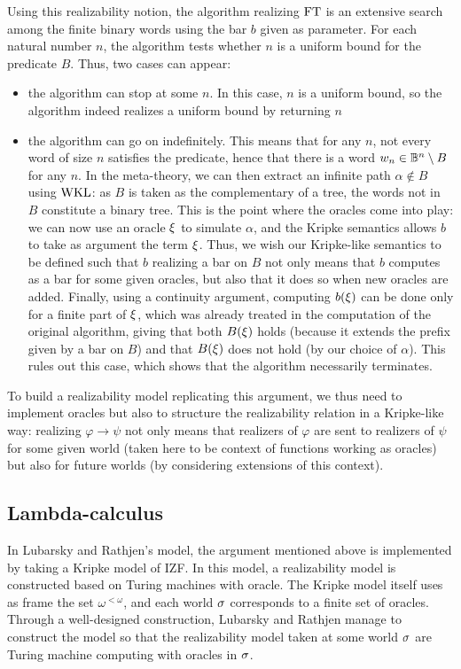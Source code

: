 \documentclass[a4paper,UKenglish,cleveref, autoref, thm-restate]{lipics-v2021}
\begin{document}
Using this realizability notion, the algorithm realizing $\mathrm{FT}$ is an extensive
search among the finite binary words using the bar $b$ given as parameter.
For each natural number $n$, the algorithm tests whether $n$ is a uniform bound
for the predicate $B$.
Thus, two cases can appear:
\begin{itemize}
\item the algorithm can stop at some $n$.
In this case, $n$ is a uniform bound, so the algorithm indeed realizes a uniform bound by returning $n$
\item the algorithm can go on indefinitely.
This means that for any $n$, not every word of size $n$ satisfies the predicate,
hence that there is a word $w_n\in \mathbb B^n \setminus B$ for any $n$.
In the meta-theory, we can then extract an infinite path $\alpha \notin B$
using $\mathrm{WKL}$: as $B$ is taken as the complementary of a tree, the words not in $B$ constitute a binary tree.
This is the point where the oracles come into play:
we can now use an oracle $\xi$ to simulate $\alpha$,
and the Kripke semantics allows $b$ to take as argument the term $\xi$.
Thus, we wish our Kripke-like semantics to be defined such that $b$ realizing a bar on $B$ not only means that $b$ computes as a bar for some given oracles, but also that it does so when new oracles are added. Finally, using a continuity argument, computing $b(\xi)$ can be done only for a finite part of $\xi$, which was already treated in the computation of the original algorithm, giving that both $B(\xi)$ holds (because it extends the prefix given by a bar on $B$) and that $B(\xi)$ does not hold (by our choice of $\alpha$). This rules out this case, which shows that the algorithm necessarily terminates.
\end{itemize}
To build a realizability model replicating this argument, we thus need to
implement oracles but also to structure the realizability relation
in a Kripke-like way: realizing $\varphi \to \psi$ not only means
that realizers of $\varphi$ are sent to realizers of $\psi$
for some given world (taken here to be context of functions working as oracles)
but also for future worlds (by considering extensions of this context).


\subsection{Lambda-calculus}

In Lubarsky and Rathjen's model\cite{LubRat13}, the argument mentioned above is implemented by taking a Kripke model of IZF. In this model, a realizability model is constructed based on Turing machines with oracle. The Kripke model itself uses as frame the set $\omega^{<\omega}$, and each world $\sigma$ corresponds to a finite set of oracles. Through a well-designed construction, Lubarsky and Rathjen manage to construct the model so that the realizability model taken at some world $\sigma$ are Turing machine computing with oracles in $\sigma$.
\end{document}
